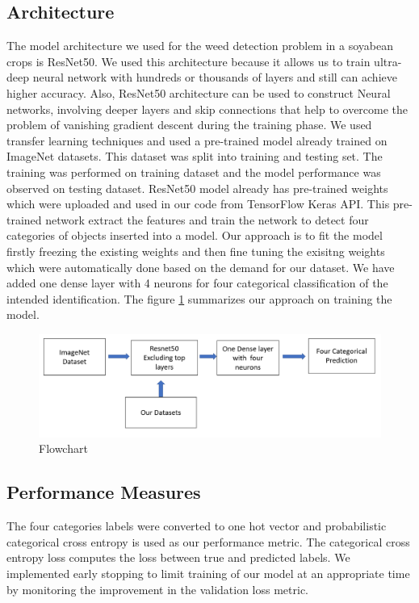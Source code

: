 \documentclass{report}
\begin{document}
\subsection{Architecture}
The model architecture we used for the weed detection problem in a soyabean crops is ResNet50. We used this architecture because it allows us to train ultra-deep neural network with hundreds or thousands of layers and still can achieve higher accuracy. Also, ResNet50 architecture can be used to construct Neural networks, involving deeper layers and skip connections that help to overcome the problem of vanishing gradient descent during the training phase. We used transfer learning techniques and used a pre-trained model already trained on ImageNet datasets. This dataset was split into training and testing set. The training was performed on training dataset and the model performance was observed on testing dataset. ResNet50 model already has pre-trained weights which were uploaded and used in our code from TensorFlow Keras API. This pre-trained network extract the features and train the network to detect four categories of objects inserted into a model. Our approach is to fit the model firstly freezing the existing weights and then fine tuning the exisitng weights which were automatically done based on the demand for our dataset. We have added one dense layer with 4 neurons for four categorical classification of the intended identification. The figure
\ref{fig:Flowchart} summarizes our approach on training the model.
\begin{figure}[H]
\centering
\includegraphics[width=\textwidth]{35.PNG}
\caption{Flowchart}
\label{fig:Flowchart}
\end{figure}

\subsection{Performance Measures}
The four categories labels were converted to one hot vector and probabilistic categorical cross entropy is used as our performance metric. The categorical cross entropy loss computes the loss between true and predicted labels. We implemented early stopping to limit training of our model at an appropriate time by monitoring the improvement in the validation loss metric. 
\end{document}
